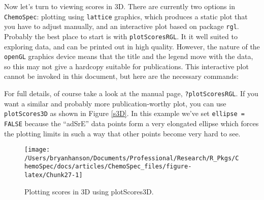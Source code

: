 \documentclass[letter,10pt,twocolumn,twoside,printwatermark=false]{pinp}
\begin{document}
Now let's turn to viewing scores in 3D. There are currently two options
in \texttt{ChemoSpec}: plotting using \texttt{lattice} graphics, which
produces a static plot that you have to adjust manually, and an
interactive plot based on package \texttt{rgl}. Probably the best place
to start is with \texttt{plotScoresRGL}. It it well suited to exploring
data, and can be printed out in high quality. However, the nature of the
\texttt{openGL} graphics device means that the title and the legend move
with the data, so this may not give a hardcopy suitable for
publications. This interactive plot cannot be invoked in this document,
but here are the necessary commands:

\begin{Shaded}
\begin{Highlighting}[]
   \NormalTok{,}
   \NormalTok{,}
   \NormalTok{) }
\end{Highlighting}
\end{Shaded}

For full details, of course take a look at the manual page,
\texttt{?plotScoresRGL}. If you want a similar and probably more
publication-worthy plot, you can use \texttt{plotScores3D} as shown in
Figure \ref{s3D}. In this example we've set \texttt{ellipse = FALSE}
because the ``adSrE'' data points form a very elongated ellipse which
forces the plotting limits in such a way that other points become very
hard to see.

\begin{Shaded}
\begin{Highlighting}[]
   \NormalTok{)}
\end{Highlighting}
\end{Shaded}

\begin{figure}

{\centering \texttt{[image: /Users/bryanhanson/Documents/Professional/Research/R\_Pkgs/ChemoSpec/docs/articles/ChemoSpec\_files/figure-latex/Chunk27-1]} 

}

\caption{\label{s3D}Plotting scores in 3D using plotScores3D.}\label{fig:Chunk27}
\end{figure}
\end{document}
